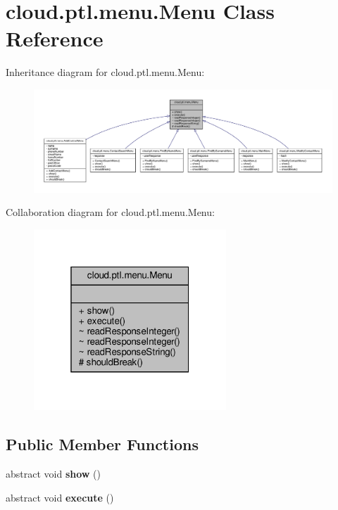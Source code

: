 \hypertarget{classcloud_1_1ptl_1_1menu_1_1Menu}{}\section{cloud.\+ptl.\+menu.\+Menu Class Reference}
\label{classcloud_1_1ptl_1_1menu_1_1Menu}


Inheritance diagram for cloud.\+ptl.\+menu.\+Menu\+:
\nopagebreak
\begin{figure}[H]
\begin{center}
\leavevmode
\includegraphics[width=350pt]{classcloud_1_1ptl_1_1menu_1_1Menu__inherit__graph}
\end{center}
\end{figure}


Collaboration diagram for cloud.\+ptl.\+menu.\+Menu\+:
\nopagebreak
\begin{figure}[H]
\begin{center}
\leavevmode
\includegraphics[width=205pt]{classcloud_1_1ptl_1_1menu_1_1Menu__coll__graph}
\end{center}
\end{figure}
\subsection*{Public Member Functions}
\begin{DoxyCompactItemize}
\item 
\mbox{\label{classcloud_1_1ptl_1_1menu_1_1Menu_a8fd769cd1ee8efca8a90433ffce38212}} 
abstract void {\bfseries show} ()
\item 
\mbox{\label{classcloud_1_1ptl_1_1menu_1_1Menu_a7078af5d8e55c04efaf15b00fcf07906}} 
abstract void {\bfseries execute} ()
\end{DoxyCompactItemize}
